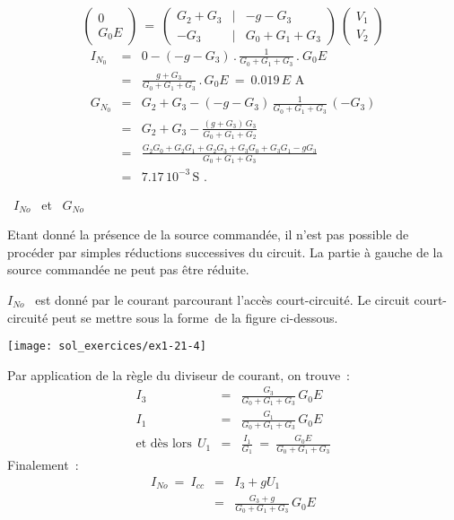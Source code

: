 \[ \left( \begin{array}{c} 0 \\\hline  G_0 E \end{array} \right)
\: = \: 
\left( \begin{array}{ccc} G_2+G_3 & | & -g-G_3  \\\hline  
-G_3 & | &  G_0 + G_1 + G_3
\end{array} \right) \:
\left( \begin{array}{c} V_1 \\\hline  V_2 \end{array}\right)  \]
\begin{eqnarray*}
I_{N_0} &=& 0 - (-g-G_3) \, . \, \frac{1}{G_0+G_1+G_3} \, . \ G_0E\\
&=& \frac{g+G_3}{G_0+G_1+G_3} \, . \, G_0E \: = \: 0.019\, E \,\, \text{A~}\\
G_{N_0} &=& G_2 + G_3 - (-g-G_3) \, \frac{1}{G_0+G_1+G_3} \, (-G_3)\\
&=& G_2+ G_3 - \frac{(g+G_3)\, G_3}{G_0+G_1+G_2} \\
&=& \frac{G_2G_0 + G_2G_1 + G_2G_3 + G_3G_0 + G_3G_1 - gG_3}{G_0+G_1+G_3}\\
&=& 7.17\, 10^{-3}\, \text{S~.}
\end{eqnarray*}

 \ $I_{No}$ \ et \ $G_{No}$

Etant donné la présence de la source commandée, il n'est pas possible
de procéder par simples réductions successives du circuit. La partie à
gauche de la source commandée ne peut pas être réduite.

$I_{No}$ \ est donné par le courant parcourant l'accès court-circuité.
Le circuit court-circuité peut se mettre sous la forme~de la figure ci-dessous.
\begin{center}
\texttt{[image: sol\_exercices/ex1-21-4]}
\end{center}


Par application de la règle du diviseur de courant, on trouve~:
\begin{eqnarray*}
I_3 &=& \frac{G_3}{G_0+G_1+G_3} \, G_0E\\
I_1 &=& \frac{G_1}{G_0+G_1+G_3} \, G_0E\\
\mbox{et dès lors} ~~U_1 &=& \frac{I_1}{G_1} \: = \: \frac{G_0E}{G_0+G_1+G_3}
\end{eqnarray*}
Finalement~:
\begin{eqnarray*}
I_{No} \:  =\:   I_{cc} &=& I_3 + gU_1\\
&=& \frac{G_3+g}{G_0+G_1+G_3} \, G_0E
\end{eqnarray*}

